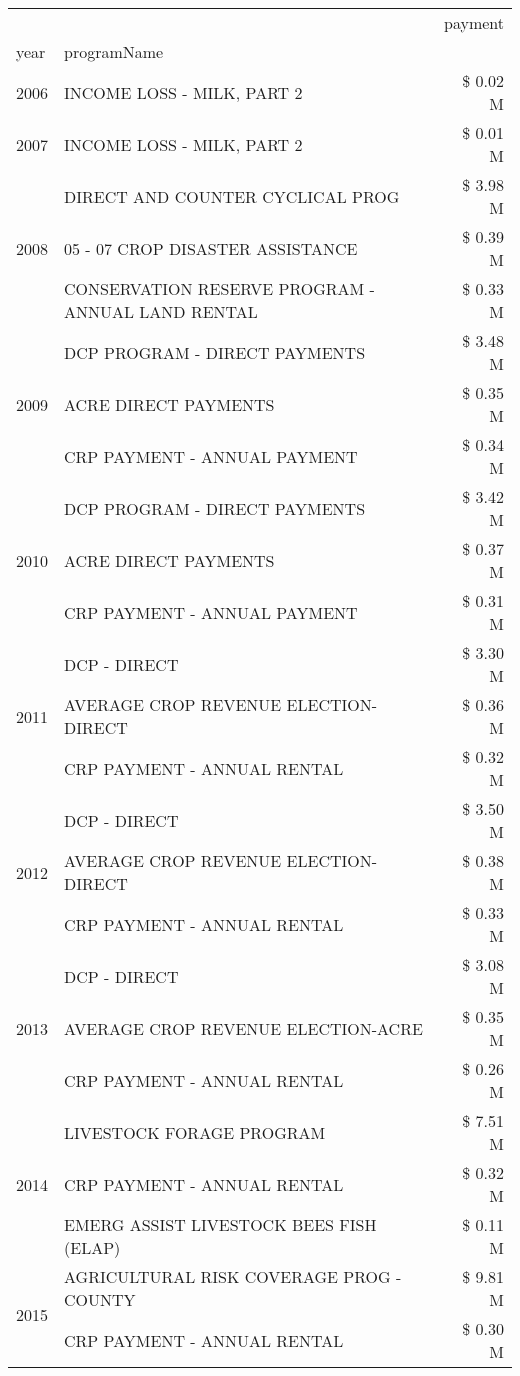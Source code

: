 \begin{tabular}{llr}
\toprule
 &  & payment \\
year & programName &  \\
\midrule
2006 & INCOME LOSS - MILK, PART 2 & \$ 0.02 M \\
\cline{1-3}
2007 & INCOME LOSS - MILK, PART 2 & \$ 0.01 M \\
\cline{1-3}
\multirow[t]{3}{*}{2008} & DIRECT AND COUNTER CYCLICAL PROG & \$ 3.98 M \\
 & 05 - 07 CROP DISASTER ASSISTANCE & \$ 0.39 M \\
 & CONSERVATION RESERVE PROGRAM - ANNUAL LAND RENTAL & \$ 0.33 M \\
\cline{1-3}
\multirow[t]{3}{*}{2009} & DCP PROGRAM - DIRECT PAYMENTS & \$ 3.48 M \\
 & ACRE DIRECT PAYMENTS & \$ 0.35 M \\
 & CRP PAYMENT - ANNUAL PAYMENT & \$ 0.34 M \\
\cline{1-3}
\multirow[t]{3}{*}{2010} & DCP PROGRAM - DIRECT PAYMENTS & \$ 3.42 M \\
 & ACRE DIRECT PAYMENTS & \$ 0.37 M \\
 & CRP PAYMENT - ANNUAL PAYMENT & \$ 0.31 M \\
\cline{1-3}
\multirow[t]{3}{*}{2011} & DCP - DIRECT & \$ 3.30 M \\
 & AVERAGE CROP REVENUE ELECTION-DIRECT & \$ 0.36 M \\
 & CRP PAYMENT - ANNUAL RENTAL & \$ 0.32 M \\
\cline{1-3}
\multirow[t]{3}{*}{2012} & DCP - DIRECT & \$ 3.50 M \\
 & AVERAGE CROP REVENUE ELECTION-DIRECT & \$ 0.38 M \\
 & CRP PAYMENT - ANNUAL RENTAL & \$ 0.33 M \\
\cline{1-3}
\multirow[t]{3}{*}{2013} & DCP - DIRECT & \$ 3.08 M \\
 & AVERAGE CROP REVENUE ELECTION-ACRE & \$ 0.35 M \\
 & CRP PAYMENT - ANNUAL RENTAL & \$ 0.26 M \\
\cline{1-3}
\multirow[t]{3}{*}{2014} & LIVESTOCK FORAGE PROGRAM & \$ 7.51 M \\
 & CRP PAYMENT - ANNUAL RENTAL & \$ 0.32 M \\
 & EMERG ASSIST LIVESTOCK BEES FISH (ELAP) & \$ 0.11 M \\
\cline{1-3}
\multirow[t]{3}{*}{2015} & AGRICULTURAL RISK COVERAGE PROG - COUNTY & \$ 9.81 M \\
 & CRP PAYMENT - ANNUAL RENTAL & \$ 0.30 M \\

\end{tabular}
